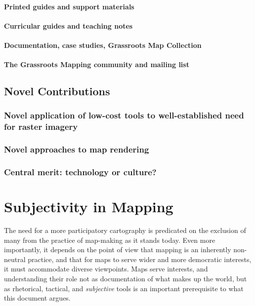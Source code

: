 \documentclass[11pt]{report}
\begin{document}
\subsubsection*{Printed guides and support materials}
\subsubsection*{Curricular guides and teaching notes}

\subsubsection*{Documentation, case studies, Grassroots Map Collection}
\subsubsection*{The Grassroots Mapping community and mailing list}
\section{Novel Contributions}
\subsection{Novel application of low-cost tools to well-established need for raster imagery}

\subsection{Novel approaches to map rendering}
\subsection{Central merit: technology or culture?}

\chapter{Subjectivity in Mapping}


The need for a more participatory cartography is predicated on the exclusion of many from the practice of map-making as it stands today. Even more importantly, it depends on the point of view that mapping is an inherently non-neutral practice, and that for maps to serve wider and more democratic interests, it must accommodate diverse viewpoints. Maps serve interests, and understanding their role not as documentation of what makes up the world, but as rhetorical, tactical, and \emph{subjective} tools is an important prerequisite to what this document argues.
\end{document}
